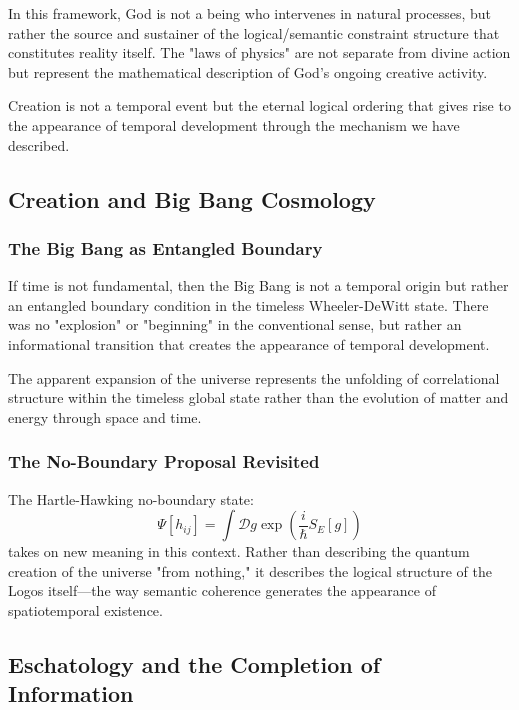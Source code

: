 \documentclass[12pt,a4paper]{article}
\begin{document}
In this framework, God is not a being who intervenes in natural processes, but rather the source and sustainer of the logical/semantic constraint structure that constitutes reality itself. The "laws of physics" are not separate from divine action but represent the mathematical description of God's ongoing creative activity.

Creation is not a temporal event but the eternal logical ordering that gives rise to the appearance of temporal development through the mechanism we have described.

\subsection{Creation and Big Bang Cosmology}

\subsubsection{The Big Bang as Entangled Boundary}

If time is not fundamental, then the Big Bang is not a temporal origin but rather an entangled boundary condition in the timeless Wheeler-DeWitt state. There was no "explosion" or "beginning" in the conventional sense, but rather an informational transition that creates the appearance of temporal development.

The apparent expansion of the universe represents the unfolding of correlational structure within the timeless global state rather than the evolution of matter and energy through space and time.

\subsubsection{The No-Boundary Proposal Revisited}

The Hartle-Hawking no-boundary state:
\begin{equation}
    \Psi[h_{ij}] = \int \mathcal{D}g \exp\left(\frac{i}{\hbar}S_E[g]\right)
\end{equation}
takes on new meaning in this context. Rather than describing the quantum creation of the universe "from nothing," it describes the logical structure of the Logos itself—the way semantic coherence generates the appearance of spatiotemporal existence.

\subsection{Eschatology and the Completion of Information}
\end{document}
